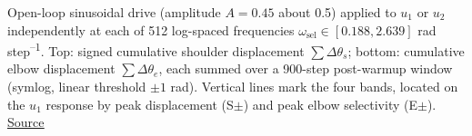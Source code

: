 Open-loop sinusoidal drive (amplitude $A=0.45$ about 0.5) applied to $u_1$ or $u_2$ independently at each of 512 log-spaced frequencies $\omega_\mathrm{sel} \in [0.188, 2.639]$ rad\,step\textsuperscript{--1}. Top: signed cumulative shoulder displacement $\sum\Delta\theta_s$; bottom: cumulative elbow displacement $\sum\Delta\theta_e$, each summed over a 900-step post-warmup window (symlog, linear threshold $\pm 1$ rad). Vertical lines mark the four bands, located on the $u_1$ response by peak displacement (S$\pm$) and peak elbow selectivity (E$\pm$). \href{https://github.com/tahmidazam/gg4/blob/main/notebooks/muscle_selection_freq_sweep/muscle_selection_freq_sweep.ipynb}{\underline{Source}}%